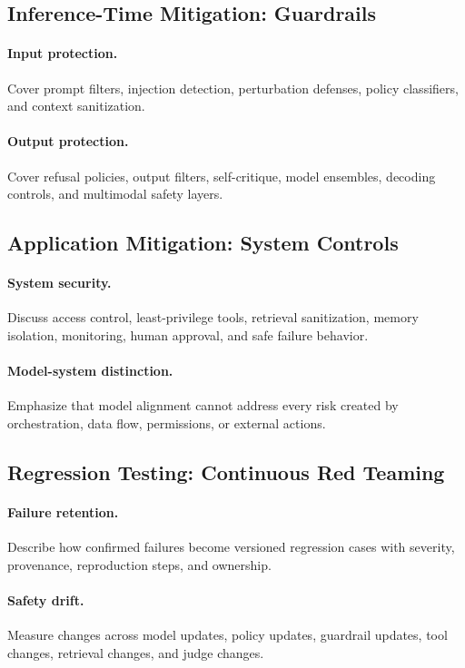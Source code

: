 \documentclass[review]{fcs}
\begin{document}
\subsection{Inference-Time Mitigation: Guardrails}

\paragraph{Input protection.}
Cover prompt filters, injection detection, perturbation defenses, policy classifiers, and context sanitization.

\paragraph{Output protection.}
Cover refusal policies, output filters, self-critique, model ensembles, decoding controls, and multimodal safety layers.

\subsection{Application Mitigation: System Controls}

\paragraph{System security.}
Discuss access control, least-privilege tools, retrieval sanitization, memory isolation, monitoring, human approval, and safe failure behavior.

\paragraph{Model-system distinction.}
Emphasize that model alignment cannot address every risk created by orchestration, data flow, permissions, or external actions.

\subsection{Regression Testing: Continuous Red Teaming}

\paragraph{Failure retention.}
Describe how confirmed failures become versioned regression cases with severity, provenance, reproduction steps, and ownership.

\paragraph{Safety drift.}
Measure changes across model updates, policy updates, guardrail updates, tool changes, retrieval changes, and judge changes.
\end{document}
